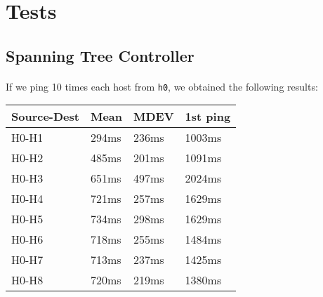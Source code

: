 \documentclass[a4paper, 11pt, oneside]{article}
\begin{document}

\section{Tests}

\subsection{Spanning Tree Controller}
\paragraph{}If we ping 10 times each host from \texttt{h0}, we obtained the following results:
\begin{table}[H]
\centering
\begin{tabular}{|l|l|l|l|}
\hline
\multicolumn{1}{|c|}{\textbf{Source-Dest}} & \multicolumn{1}{c|}{\textbf{Mean}} & \multicolumn{1}{c|}{\textbf{MDEV}} & \multicolumn{1}{c|}{\textbf{1st ping}} \\ \hline
H0-H1                                      & 294ms                              & 236ms                              & 1003ms                                 \\ \hline
H0-H2                                      & 485ms                              & 201ms                              & 1091ms                                 \\ \hline
H0-H3                                      & 651ms                              & 497ms                              & 2024ms                                 \\ \hline
H0-H4                                      & 721ms                              & 257ms                              & 1629ms                                 \\ \hline
H0-H5                                      & 734ms                              & 298ms                              & 1629ms                                 \\ \hline
H0-H6                                      & 718ms                              & 255ms                              & 1484ms                                 \\ \hline
H0-H7                                      & 713ms                              & 237ms                              & 1425ms                                 \\ \hline
H0-H8                                      & 720ms                              & 219ms                              & 1380ms                                 \\ \hline

\end{tabular}
\end{table}
\end{document}
